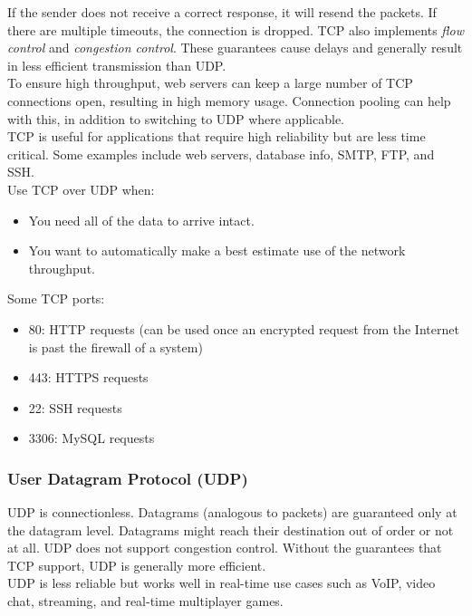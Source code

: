 \documentclass[12pt, titlepage]{article}
\begin{document}
If the sender does not receive a correct response, it will resend the packets. If there are multiple timeouts, the connection is dropped. TCP also implements \textit{flow control} and \textit{congestion control}. These guarantees cause delays and generally result in less efficient transmission than UDP. \\

To ensure high throughput, web servers can keep a large number of TCP connections open, resulting in high memory usage. Connection pooling can help with this, in addition to switching to UDP where applicable. \\

TCP is useful for applications that require high reliability but are less time critical. Some examples include web servers, database info, SMTP, FTP, and SSH. \\

Use TCP over UDP when:
\begin{itemize}
  \item You need all of the data to arrive intact.
  \item You want to automatically make a best estimate use of the network throughput.
\end{itemize}

Some TCP ports:
\begin{itemize}
  \item 80: HTTP requests (can be used once an encrypted request from the Internet is past the firewall of a system)
  \item 443: HTTPS requests
  \item 22: SSH requests
  \item 3306: MySQL requests
\end{itemize}

\subsubsection{User Datagram Protocol (UDP)}

UDP is connectionless. Datagrams (analogous to packets) are guaranteed only at the datagram level. Datagrams might reach their destination out of order or not at all. UDP does not support congestion control. Without the guarantees that TCP support, UDP is generally more efficient. \\

UDP is less reliable but works well in real-time use cases such as VoIP, video chat, streaming, and real-time multiplayer games.
\end{document}

